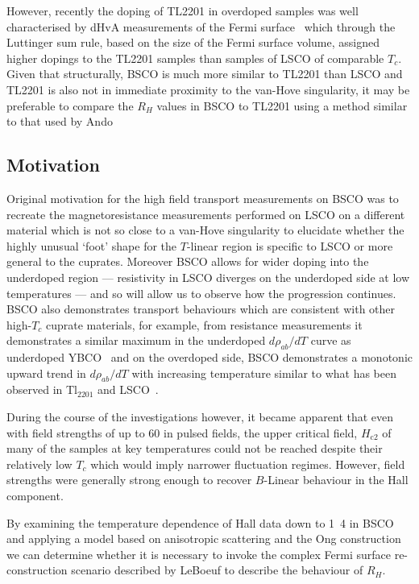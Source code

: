 However, recently the doping of \ac{TL2201} in overdoped samples was well characterised by \ac{dHvA} measurements of the Fermi surface~\cite{Rourke2010b} which through the Luttinger sum rule, based on the size of the Fermi surface volume, assigned higher dopings to the \ac{TL2201} samples than samples of \ac{LSCO} of comparable $T_c$. Given that structurally, \ac{BSCO} is much more similar to \ac{TL2201} than \ac{LSCO} and \ac{TL2201} is also not in immediate proximity to the van-Hove singularity, it may be preferable to compare the $R_H$ values in \ac{BSCO} to \ac{TL2201} using a method similar to that used by Ando \etal

\subsection{Motivation}

Original motivation for the high field transport measurements on \ac{BSCO} was to recreate the magnetoresistance measurements performed on \ac{LSCO} on a different material which is not so close to a van-Hove singularity to elucidate whether the highly unusual `foot' shape for the $T$-linear region is specific to \ac{LSCO} or more general to the cuprates. Moreover \ac{BSCO} allows for wider doping into the underdoped region --- resistivity in \ac{LSCO} diverges on the underdoped side at low temperatures --- and so will allow us to observe how the progression continues.  \ac{BSCO} also demonstrates transport behaviours which are consistent with other high-$T_c$ cuprate materials, for example, from resistance measurements it demonstrates a similar maximum in the underdoped $d\rho_{ab}/dT$ curve as underdoped YBCO~\cite{Ando1999} and on the overdoped side, \ac{BSCO} demonstrates a monotonic upward trend in $d\rho_{ab}/dT$ with increasing temperature similar to what has been observed in Tl$_{2201}$ and \ac{LSCO}~\cite{Ando1999}.

During the course of the investigations however, it became apparent that even with field strengths of up to \unit{60}{\tesla} in pulsed fields, the upper critical field, $H_{\textrm{c2}}$ of many of the samples at key temperatures could not be reached despite their relatively low $T_c$ which would imply narrower fluctuation regimes. However, field strengths were generally strong enough to recover $B$-Linear behaviour in the Hall component.

By examining the temperature dependence of Hall data down to \unit{1.4}{\kelvin} in \ac{BSCO} and applying a model based on anisotropic scattering and the Ong construction we can determine whether it is necessary to invoke the complex Fermi surface re-construction scenario described by LeBoeuf \etal to describe the behaviour of $R_H$.

